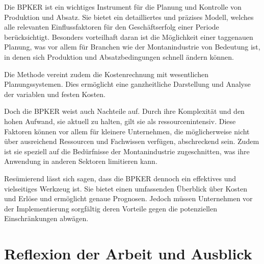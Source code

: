 

Die BPKER ist ein wichtiges Instrument für die Planung und Kontrolle von Produktion und Absatz. Sie bietet ein detailliertes und präzises Modell, welches alle relevanten Einflussfaktoren für den Geschäftserfolg einer Periode berücksichtigt. Besonders vorteilhaft daran ist die Möglichkeit einer taggenauen Planung, was vor allem für Branchen wie der Montanindustrie von Bedeutung ist, in denen sich Produktion und Absatzbedingungen schnell ändern können.

Die Methode vereint zudem die Kostenrechnung mit wesentlichen Planungssystemen. Dies ermöglicht eine ganzheitliche Darstellung und Analyse der variablen und festen Kosten.

Doch die BPKER weist auch Nachteile auf. Durch ihre Komplexität und den hohen Aufwand, sie aktuell zu halten, gilt sie als ressourcenintensiv. Diese Faktoren können vor allem für kleinere Unternehmen, die möglicherweise nicht über ausreichend Ressourcen und Fachwissen verfügen, abschreckend sein. Zudem ist sie speziell auf die Bedürfnisse der Montanindustrie zugeschnitten, was ihre Anwendung in anderen Sektoren limitieren kann.

Resümierend lässt sich sagen, dass die BPKER dennoch ein effektives und vielseitiges Werkzeug ist. Sie bietet einen umfassenden Überblick über Kosten und Erlöse und ermöglicht genaue Prognosen. Jedoch müssen Unternehmen vor der Implementierung sorgfältig deren Vorteile gegen die potenziellen Einschränkungen abwägen.

\section{Reflexion der Arbeit und Ausblick}

